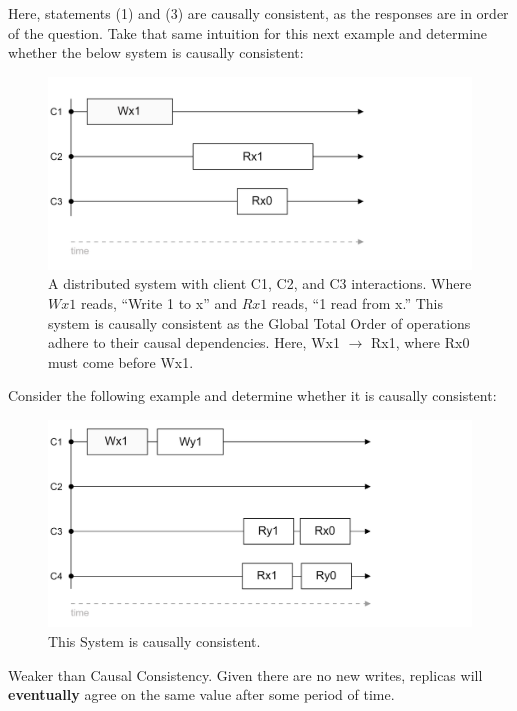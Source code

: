 \noindent
Here, statements (1) and (3) are causally consistent, as the responses are in order of the question. Take 
that same intuition for this next example and determine whether the below system is causally consistent:

\begin{figure}[h]
    \centering
    \includegraphics[width=.9\textwidth]{Sections/consist/cas1.png}
    \caption{A distributed system with client C1, C2, and C3 interactions. Where $Wx1$ reads, ``Write 1 to x'' and $Rx1$ reads, ``1 read from x.'' This 
    system is causally consistent as the Global Total Order of operations adhere to their causal dependencies. Here, Wx1 $\rightarrow$ Rx1, where Rx0 must come before Wx1.}
\end{figure}

\newpage 

\noindent
Consider the following example and determine whether it is causally consistent:
\begin{figure}[h] 
    \centering
    \includegraphics[width=.9\textwidth]{Sections/consist/seq3.png}
    \caption{This 
    System is causally consistent.}
\end{figure}

\begin{Def}
    
    Weaker than Causal Consistency. Given there are no new writes, replicas will \textbf{eventually} agree on the same value 
    after some period of time.
\end{Def}


